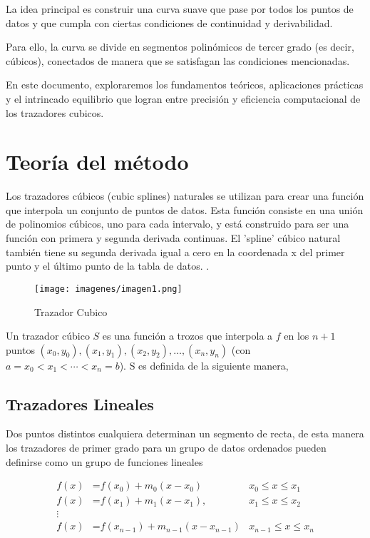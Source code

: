 \documentclass[conference]{IEEEtran}
\begin{document}
La idea principal es construir una curva suave que pase por todos los puntos de datos y que cumpla con ciertas condiciones de continuidad y derivabilidad.

Para ello, la curva se divide en segmentos polinómicos de tercer grado (es decir, cúbicos), conectados de manera que se satisfagan las condiciones mencionadas.

En este documento, exploraremos los fundamentos teóricos, aplicaciones prácticas y el intrincado equilibrio que logran entre precisión y eficiencia computacional de los trazadores cubicos.



\section{Teoría del método}
Los trazadores cúbicos (cubic splines) naturales se utilizan para crear una función que interpola un conjunto de puntos de datos. Esta función consiste en una unión de polinomios cúbicos, uno para cada intervalo, y está construido para ser una función con  primera y segunda derivada continuas. El ’spline’ cúbico natural también
tiene su segunda derivada igual a cero en la coordenada x del primer punto y el último punto de la tabla de datos.
\cite{Trazadores_cúbicos_2014}.
\begin{figure} [h]
            \centering
            \texttt{[image: imagenes/imagen1.png]}
            \caption{Trazador Cubico}
            \label{fig:fig1 }
       \end{figure}

Un trazador cúbico $S$ es una función a trozos que interpola a $f$ en los
$n + 1$ puntos $(x_0, y_0), (x_1, y_1), (x_2, y_2), \dots, (x_n, y_n)$
(con $a = x_0 < x_1 < \cdots < x_n = b$). S es definida de la siguiente manera,

\subsection{Trazadores Lineales}

Dos puntos distintos cualquiera determinan un segmento de recta, de esta
manera los trazadores de primer grado para un grupo de datos ordenados
pueden definirse como un grupo de funciones lineales

\begin{align*}
	f(x)   & \text{=} f(x_{0}) + m_{0}(x - x_{0})             & x_{0} \leq x \leq x_{1}     \\
	f(x)   & \text{=} f(x_{1}) + m_{1}(x - x_{1}),            & x_{1} \leq x \leq x_{2}     \\
	\vdots &                                           &                             \\
	f(x)   & \text{=} f(x_{n - 1}) + m_{n - 1}(x - x_{n - 1}) & x_{n - 1} \leq x \leq x_{n}
\end{align*}
\end{document}
